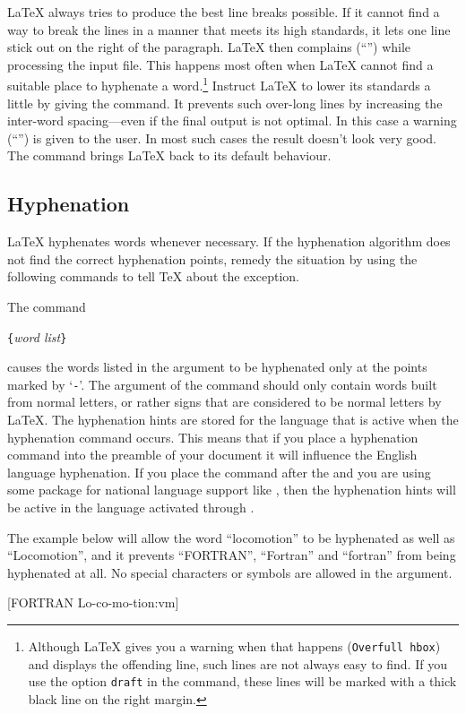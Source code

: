 \LaTeX{} always tries to produce the best line breaks possible. If it
cannot find a way to break the lines in a manner that meets its high
standards, it lets one line stick out on the right of the paragraph.
\LaTeX{} then complains (``'') while processing the
input file. This happens most often when \LaTeX{} cannot find a
suitable place to hyphenate a word.\footnote{Although \LaTeX{} gives
  you a warning when that happens (\texttt{Overfull \bs{}hbox}) and displays the
  offending line, such lines are not always easy to find. If you use
  the option \texttt{draft} in the  command, these
  lines will be marked with a thick black line on the right margin.}
Instruct \LaTeX{} to lower its standards a little by giving
the  command. It prevents such over-long lines by
increasing the inter-word spacing---even if the final output is not
optimal.  In this case a warning (``'') is given to
the user.  In most such cases the result doesn't look very good. The
command  brings \LaTeX{} back to its default behaviour.

\subsection{Hyphenation}\label{hyph}

\LaTeX{} hyphenates words whenever necessary. If the hyphenation
algorithm does not find the correct hyphenation points,
remedy the situation by using the following commands to tell \TeX{}
about the exception.

The command
\begin{lscommand}
  \verb|{|\emph{word list}\verb|}|
\end{lscommand}
causes the words listed in the argument to be hyphenated only at the points
marked by \enquote*{\texttt{-}}.  The argument of the command should only contain
words built from normal letters, or rather signs that are considered to be
normal letters by \LaTeX{}. The hyphenation hints are stored for the language
that is active when the hyphenation command occurs. This means that if you
place a hyphenation command into the preamble of your document it will
influence the English language hyphenation. If you place the command after the
\verb|| and you are using some package for national language
support like , then the hyphenation hints will be active in
the language activated through .

The example below will allow the word \enquote{locomotion} to be hyphenated as
well as \enquote{Locomotion}, and it prevents \enquote{FORTRAN},
\enquote{Fortran} and \enquote{fortran} from being hyphenated at all.  No
special characters or symbols are allowed in the argument.
\begin{code}
[FORTRAN Lo-co-mo-tion:vm]
\end{code}

